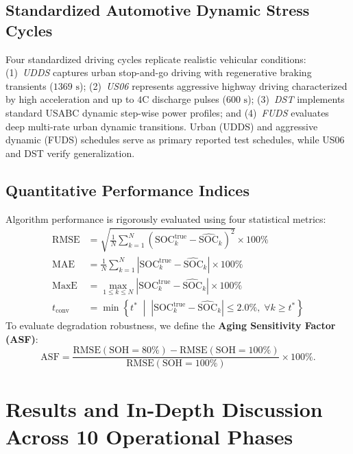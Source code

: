 \documentclass[balance,nocopyright,upint,varvw,hyphenate,barcolor=NavyBlue,nolists]{asmejour}
\begin{document}
\subsection{Standardized Automotive Dynamic Stress Cycles}
Four standardized driving cycles replicate realistic vehicular conditions: (1)~\emph{UDDS} captures urban stop-and-go driving with regenerative braking transients ($1369\text{ s}$); (2)~\emph{US06} represents aggressive highway driving characterized by high acceleration and up to $4\text{C}$ discharge pulses ($600\text{ s}$); (3)~\emph{DST} implements standard USABC dynamic step-wise power profiles; and (4)~\emph{FUDS} evaluates deep multi-rate urban dynamic transitions. Urban (UDDS) and aggressive dynamic (FUDS) schedules serve as primary reported test schedules, while US06 and DST verify generalization.

\subsection{Quantitative Performance Indices}
Algorithm performance is rigorously evaluated using four statistical metrics:
\begin{align}
\text{RMSE} &= \sqrt{\frac{1}{N}\sum_{k=1}^N \left(\text{SOC}_k^{\text{true}} - \widehat{\text{SOC}}_k\right)^2} \times 100\% \label{eqn:rmse}\\
\text{MAE} &= \frac{1}{N}\sum_{k=1}^N \left|\text{SOC}_k^{\text{true}} - \widehat{\text{SOC}}_k\right| \times 100\% \label{eqn:mae}\\
\text{MaxE} &= \max_{1 \le k \le N} \left|\text{SOC}_k^{\text{true}} - \widehat{\text{SOC}}_k\right| \times 100\% \label{eqn:maxe}\\
t_{\text{conv}} &= \min\left\{ t^* \;\middle|\; \left|\text{SOC}_k^{\text{true}} - \widehat{\text{SOC}}_k\right| \le 2.0\%, \;\forall k \ge t^* \right\} \label{eqn:tconv}
\end{align}
To evaluate degradation robustness, we define the \textbf{Aging Sensitivity Factor (ASF)}:
\begin{equation}\label{eqn:asf}
\text{ASF} = \frac{\text{RMSE}(\text{SOH}=80\%) - \text{RMSE}(\text{SOH}=100\%)}{\text{RMSE}(\text{SOH}=100\%)} \times 100\%.
\end{equation}

\section{Results and In-Depth Discussion Across 10 Operational Phases}
\end{document}

